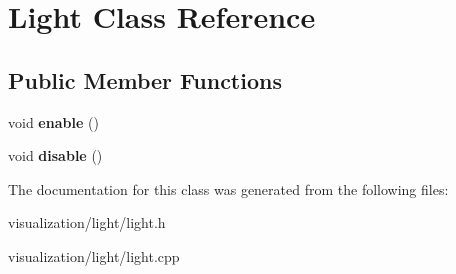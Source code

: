 \section{\-Light \-Class \-Reference}
\label{d9/de7/classLight}
\subsection*{\-Public \-Member \-Functions}
\begin{DoxyCompactItemize}
\item 
void {\bfseries enable} ()\label{d9/de7/classLight_a2e8c77656d28ff979c9dbc3b77676304}

\item 
void {\bfseries disable} ()\label{d9/de7/classLight_a1a6f283bf8d2f0411081b5ab8a4c680b}

\end{DoxyCompactItemize}


\-The documentation for this class was generated from the following files\-:\begin{DoxyCompactItemize}
\item 
visualization/light/light.\-h\item 
visualization/light/light.\-cpp\end{DoxyCompactItemize}
